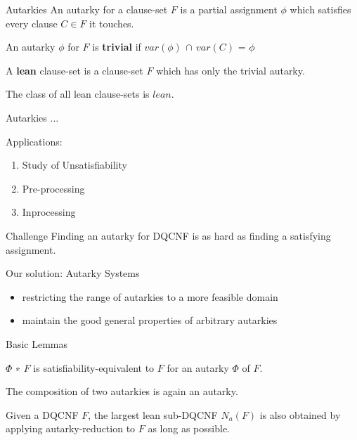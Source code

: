 \documentclass[xcolor=table	]{beamer}
\begin{document}
\begin{frame}{Autarkies}
An autarky for a clause-set $F$ is a partial assignment $\phi$ which satisfies every clause $C \in F$ it touches. \newline

An autarky $\phi$ for $F$ is \textbf{trivial} if $var(\phi) \, \cap \, var(C)$ = $\phi$ \newline

A \textbf{lean} clause-set is a clause-set $F$ which has
only the trivial autarky. \newline 

The class of all lean clause-sets is $lean$.

\end{frame}


\begin{frame}{Autarkies ...}

Applications: 
\begin{enumerate}
    \item Study of Unsatisfiability
    \item Pre-processing 
    \item Inprocessing
\end{enumerate}

 \begin{exampleblock}{Challenge}
 Finding an autarky for DQCNF is as hard as finding a satisfying assignment.
\end{exampleblock}
    
  \begin{alertblock}{Our solution: Autarky Systems}
  \begin{itemize}
      \item restricting the range of autarkies to a more feasible domain
      \item maintain the good general properties of arbitrary autarkies
  \end{itemize}
 
  \end{alertblock}

\end{frame}

\begin{frame}{Basic Lemmas}
 \begin{lemma}[1]
   $\Phi$ ∗ $F$ is satisfiability-equivalent to $F$ for an autarky $\Phi$ of $F$.
 \end{lemma}
 
  \begin{lemma}[2]
  The composition of two autarkies is again an autarky.
 \end{lemma}
 
  \begin{lemma}[3]
   Given a DQCNF $F$, the largest lean sub-DQCNF $N_{a} (F)$ is also obtained by applying autarky-reduction to $F$ as long as possible.
 \end{lemma}
 
\end{frame}
\end{document}
